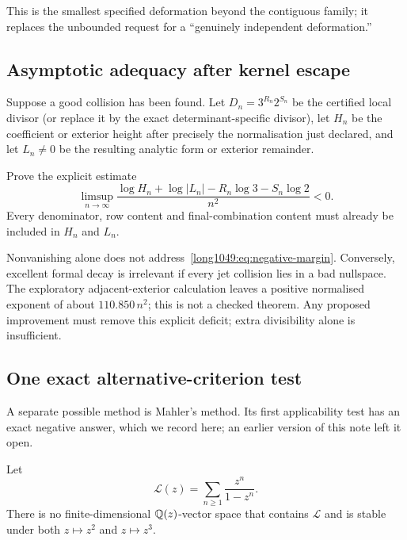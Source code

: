 \documentclass[11pt]{article}
\begin{document}
This is the smallest specified deformation beyond the contiguous family; it
replaces the unbounded request for a “genuinely independent deformation.”

\subsection{Asymptotic adequacy after kernel escape}

Suppose a good collision has been found.  Let $D_n=3^{R_n}2^{S_n}$ be the
certified local divisor (or replace it by the exact determinant-specific
divisor), let $H_n$ be the coefficient or exterior height after precisely the
normalisation just declared, and let $L_n\ne0$ be the resulting analytic form
or exterior remainder.

\begin{problem}
Prove the explicit estimate
\[
 \limsup_{n\to\infty}
 \frac{\log H_n+\log|L_n|-R_n\log3-S_n\log2}{n^2}<0.
\tag{8.3}\label{long1049:eq:negative-margin}
\]
Every denominator, row content and final-combination content must already be
included in $H_n$ and $L_n$.
\end{problem}

Nonvanishing alone does not address~\eqref{long1049:eq:negative-margin}.  Conversely,
excellent formal decay is irrelevant if every jet collision lies in a bad
nullspace.  The exploratory adjacent-exterior calculation leaves a positive
normalised exponent of about $110.850\,n^2$; this is not a checked theorem.
Any proposed improvement must remove this explicit deficit; extra divisibility
alone is insufficient.

\subsection{One exact alternative-criterion test}

A separate possible method is Mahler's method.  Its first applicability test has
an exact negative answer, which we record here; an earlier version of this note
left it open.

\begin{proposition}\label{long1049:res:nomahler}
Let
\[
 \mathcal L(z)=\sum_{n\ge1}\frac{z^n}{1-z^n}.
\]
There is no finite-dimensional $\mathbb{Q}(z)$-vector space that contains $\mathcal L$
and is stable under both $z\mapsto z^2$ and $z\mapsto z^3$.
\end{proposition}
\end{document}
